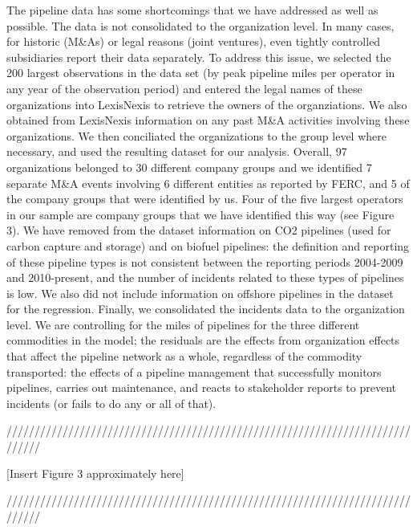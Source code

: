 The pipeline data has some shortcomings that we have addressed as well as possible. The data is not consolidated to the organization level. In many cases, for historic (M\&As) or legal reasons (joint ventures), even tightly controlled subsidiaries report their data separately. To address this issue, we selected the 200 largest observations in the data set (by peak pipeline miles per operator in any year of the observation period) and entered the legal names of these organizations into LexisNexis to retrieve the owners of the organziations. We also obtained from LexisNexis information on any past M\&A activities involving these organizations. We then conciliated the organizations to the group level where necessary, and used the resulting dataset for our analysis. Overall, 97 organizations belonged to 30 different company groups and we identified 7 separate M\&A events involving 6 different entities as reported by FERC, and 5 of the company groups that were identified by us. Four of the five largest operators in our sample are company groups that we have identified this way (see Figure 3). We have removed from the dataset information on CO2 pipelines (used for carbon capture and storage) and on biofuel pipelines: the definition and reporting of these pipeline types is not consistent between the reporting periods 2004-2009 and 2010-present, and the number of incidents related to these types of pipelines is low. We also did not include information on offshore pipelines in the dataset for the regression. Finally, we consolidated the incidents data to the organization level. We are controlling for the miles of pipelines for the three different commodities in the model; the residuals are the effects from organization effects that affect the pipeline network as a whole, regardless of the commodity transported: the effects of a pipeline management that successfully monitors pipelines, carries out maintenance, and reacts to stakeholder reports to prevent incidents (or fails to do any or all of that).

{\centering
	//////////////////////////////////////////////////////////////////////////////
	
	[Insert Figure 3 approximately here]
	
	//////////////////////////////////////////////////////////////////////////////\par
}

